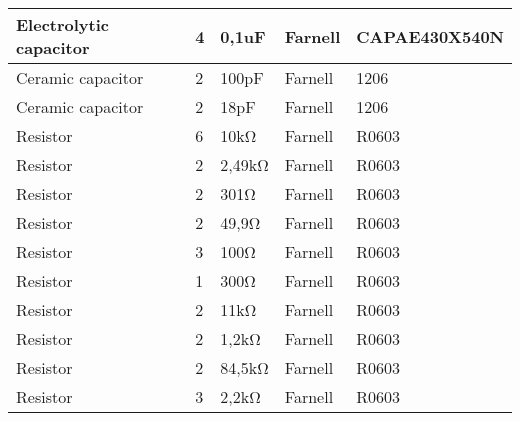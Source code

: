 \documentclass[10pt, titlepage]{article}
\begin{document}
\begin{center}
\begin{tabularx}{\textwidth}{|X|l|l|l|l|}
    Electrolytic capacitor & 4 & 0,1uF & Farnell & CAPAE430X540N \\ \hline
    Ceramic capacitor & 2 & 100pF & Farnell & 1206 \\ \hline
   Ceramic capacitor & 2 & 18pF & Farnell & 1206 \\ \hline
    Resistor & 6 & 10kΩ & Farnell & R0603\\ \hline
    Resistor & 2 & 2,49kΩ & Farnell & R0603 \\ \hline
    Resistor & 2 & 301Ω & Farnell & R0603 \\ \hline
    Resistor & 2 & 49,9Ω & Farnell & R0603 \\ \hline
    Resistor & 3 & 100Ω & Farnell & R0603 \\ \hline
    Resistor & 1 & 300Ω & Farnell & R0603 \\ \hline
    Resistor & 2 & 11kΩ & Farnell & R0603 \\ \hline
    Resistor & 2 & 1,2kΩ  & Farnell & R0603 \\ \hline
    Resistor & 2 & 84,5kΩ & Farnell & R0603 \\ \hline
    Resistor & 3 & 2,2kΩ & Farnell & R0603 \\ \hline
	\end{tabularx}
\end{center}
\end{document}
